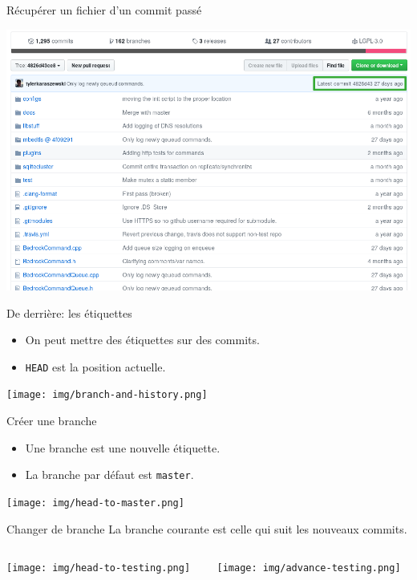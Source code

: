 \documentclass{beamer}
\begin{document}
\begin{frame}{Récupérer un fichier d'un commit passé}
    \begin{center}
    	\includegraphics[scale=0.3]{img/rollback_3.png}
    \end{center}
\end{frame}

\begin{frame}{De derrière: les étiquettes}
    \begin{itemize}
        \item On peut mettre des étiquettes sur des commits.
        \item \texttt{HEAD} est la position actuelle.
    \end{itemize}
    \texttt{[image: img/branch-and-history.png]}
\end{frame}

\begin{frame}{Créer une branche}
    \begin{itemize}
        \item Une branche est une nouvelle étiquette.
        \item La branche par défaut est \texttt{master}.
    \end{itemize}
    \begin{center}
        \texttt{[image: img/head-to-master.png]}
    \end{center}
\end{frame}

\begin{frame}{Changer de branche}
    La branche courante est celle qui suit les nouveaux commits.
    \begin{columns}
        \begin{column}{0.44\textwidth}
            \begin{center}
                \texttt{[image: img/head-to-testing.png]}
            \end{center}
        \end{column}
        \begin{column}{0.54\textwidth}
            \texttt{[image: img/advance-testing.png]}
        \end{column}
    \end{columns}
\end{frame}
\end{document}

